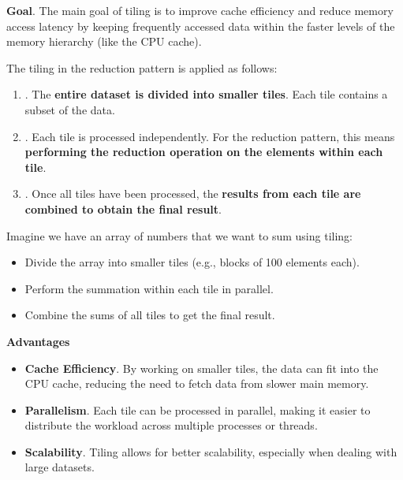 \highspace
\textcolor{Green3}{ \textbf{Goal}}. The main goal of tiling is to improve cache efficiency and reduce memory access latency by keeping frequently accessed data within the faster levels of the memory hierarchy (like the CPU cache).

\highspace
The tiling in the reduction pattern is applied as follows:
\begin{enumerate}
    \item {}. The \textbf{entire dataset is divided into smaller tiles}. Each tile contains a subset of the data.

    \item {}. Each tile is processed independently. For the reduction pattern, this means \textbf{performing the reduction operation on the elements within each tile}.

    \item {}. Once all tiles have been processed, the \textbf{results from each tile are combined to obtain the final result}.
\end{enumerate}

\highspace
\begin{examplebox}
    Imagine we have an array of numbers that we want to sum using tiling:
    \begin{itemize}
        \item Divide the array into smaller tiles (e.g., blocks of 100 elements each).
        \item Perform the summation within each tile in parallel.
        \item Combine the sums of all tiles to get the final result.
    \end{itemize}
\end{examplebox}

\highspace
\begin{flushleft}
    \textcolor{Green3}{ \textbf{Advantages}}
\end{flushleft}
\begin{itemize}[label=\textcolor{Green3}{}]
    \item \textcolor{Green3}{\textbf{Cache Efficiency}}. By working on smaller tiles, the data can fit into the CPU cache, reducing the need to fetch data from slower main memory.

    \item \textcolor{Green3}{\textbf{Parallelism}}. Each tile can be processed in parallel, making it easier to distribute the workload across multiple processes or threads.

    \item \textcolor{Green3}{\textbf{Scalability}}. Tiling allows for better scalability, especially when dealing with large datasets.
\end{itemize}

